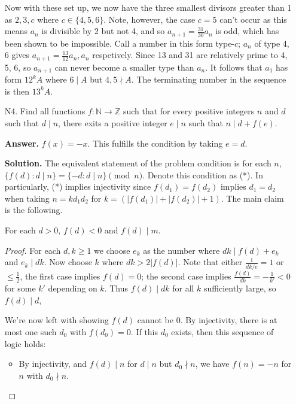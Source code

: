 \documentclass[11pt,a4paper]{article}
\begin{document}
\begin{enumerate}
    	Now with these set up, we now have the three smallest divisors greater than 1 as $2, 3, c$ where $c\in \{4, 5, 6\}$. 
    	Note, however, the case $c=5$ can't occur as this means $a_n$ is divisible by 2 but not 4, and so $a_{n+1}=\frac{31}{30}a_n$ is odd, which has been shown to be impossible. 
    	Call a number in this form type-$c$; $a_n$ of type 4, 6 gives $a_{n+1}=\frac{13}{12}a_n, a_n$ respetively. 
    	Since 13 and 31 are relatively prime to 4, 5, 6, so $a_{n+1}$ can never become a smaller type than $a_n$. 
    	It follows that $a_1$ has form $12^{k}A$ where $6\mid A$ but $4, 5\nmid A$. 
    	The terminating number in the sequence is then $13^kA$. 
    	
    	
    	\item [N4.]
    	Find all functions $f:\mathbb{N}\to \mathbb{Z}$ such that for every positive integers $n$ and $d$ such that $d\mid n$, there exits a positive integer $e\mid n$ such that $n\mid d+f(e)$.
    	
    	\textbf{Answer.} $f(x)=-x$. This fulfills the condition by taking $e = d$. 
    	
    	\textbf{Solution.} The equivalent statement of the problem condition is 
    	for each $n$, $\{f(d): d\mid n\} = \{-d: d\mid n\}\pmod{n}$. Denote this condition as (*). 
    	In particularly, (*) implies injectivity since $f(d_1)=f(d_2)$ implies $d_1=d_2$ when taking $n = kd_1d_2$ for $k=(|f(d_1)|+|f(d_2)|+1)$. 
    	The main claim is the following. 
    	
    	\begin{lemma}
    		For each $d > 0$, $f(d) < 0$ and $f(d)\mid m$. 
    	\end{lemma}
        
        \begin{proof}
    	For each $d, k\ge 1$ we choose $e_k$ as the number where $dk\mid f(d) + e_k$ and $e_k\mid dk$. 
    	Now choose $k$ where $dk > 2|f(d)|$. Note that either $\frac{1}{dk/e}=1$ or $\le \frac 12$, 
    	the first case implies $f(d)=0$; the second case implies $\frac{f(d)}{dk} = -\frac{1}{k'}<0$ for some $k'$ depending on $k$. 
    	Thus $f(d)\mid dk$ for all $k$  sufficiently large, 
    	so $f(d)\mid d$, 
    	
    	We're now left with showing $f(d)$ cannot be 0. 
    	By injectivity, there is at most one such $d_0$ with $f(d_0)=0$. 
    	If this $d_0$ exists, then this sequence of logic holds: 
    	\begin{itemize}
    		\item By injectivity, and $f(d)\mid n$ for $d\mid n$ but $d_0\nmid n$, we have $f(n)=-n$ for $n$ with $d_0\nmid n$. 
    		

\end{itemize}
\end{proof}
\end{enumerate}
\end{document}
